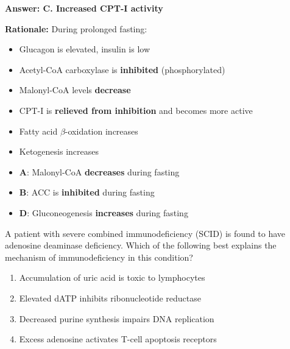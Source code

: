 \begin{solution}
\textbf{Answer: C. Increased CPT-I activity}

\textbf{Rationale:} During prolonged fasting:
\begin{itemize}
    \item Glucagon is elevated, insulin is low
    \item Acetyl-CoA carboxylase is \textbf{inhibited} (phosphorylated)
    \item Malonyl-CoA levels \textbf{decrease}
    \item CPT-I is \textbf{relieved from inhibition} and becomes more active
    \item Fatty acid $\beta$-oxidation increases
    \item Ketogenesis increases
\end{itemize}

\begin{itemize}
    \item \textbf{A}: Malonyl-CoA \textbf{decreases} during fasting
    \item \textbf{B}: ACC is \textbf{inhibited} during fasting
    \item \textbf{D}: Gluconeogenesis \textbf{increases} during fasting
\end{itemize}
\end{solution}

\begin{exercise}
A patient with severe combined immunodeficiency (SCID) is found to have adenosine deaminase deficiency. Which of the following best explains the mechanism of immunodeficiency in this condition?
\begin{enumerate}[label=\Alph*.]
    \item Accumulation of uric acid is toxic to lymphocytes
    \item Elevated dATP inhibits ribonucleotide reductase
    \item Decreased purine synthesis impairs DNA replication
    \item Excess adenosine activates T-cell apoptosis receptors
\end{enumerate}
\end{exercise}

